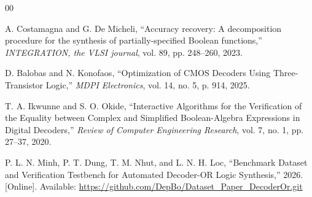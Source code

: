 \documentclass[runningheads]{llncs}
\begin{document}
\begin{thebibliography}{00}

A. Costamagna and G. De Micheli, ``Accuracy recovery: A decomposition procedure for the synthesis of partially-specified Boolean functions,'' \emph{INTEGRATION, the VLSI journal}, vol. 89, pp. 248--260, 2023.

D. Balobas and N. Konofaos, ``Optimization of CMOS Decoders Using Three-Transistor Logic,'' \emph{MDPI Electronics}, vol. 14, no. 5, p. 914, 2025.

T. A. Ikwunne and S. O. Okide, ``Interactive Algorithms for the Verification of the Equality between Complex and Simplified Boolean-Algebra Expressions in Digital Decoders,'' \emph{Review of Computer Engineering Research}, vol. 7, no. 1, pp. 27--37, 2020.

P. L. N. Minh, P. T. Dung, T. M. Nhut, and L. N. H. Loc, ``Benchmark Dataset and Verification Testbench for Automated Decoder-OR Logic Synthesis,'' 2026. [Online]. Available: \url{https://github.com/DepBo/Dataset_Paper_DecoderOr.git}

\end{thebibliography}
\end{document}
